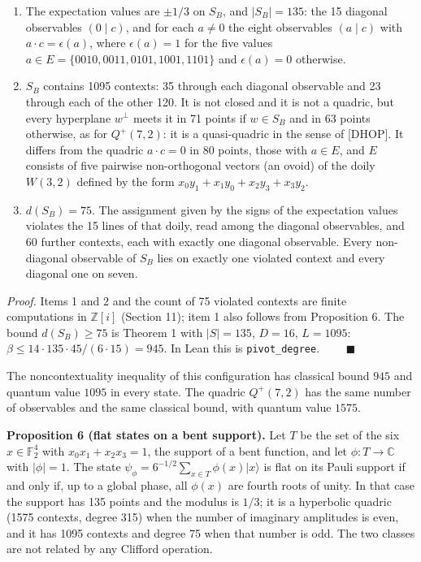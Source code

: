 \documentclass[11pt,a4paper]{article}
\providecommand{\tightlist}{\setlength{\itemsep}{0pt}\setlength{\parskip}{0pt}}
\begin{document}
\begin{enumerate}
\def\labelenumi{\arabic{enumi}.}
\tightlist
\item
  The expectation values are \(\pm 1/3\) on \(S_B\), and \(|S_B| = 135\): the 15 diagonal observables
  \((0 \mid c)\), and for each \(a \ne 0\) the eight observables \((a \mid c)\) with \(a \cdot c = \epsilon(a)\), where
  \(\epsilon(a) = 1\) for the five values \(a \in E = \{0010, 0011, 0101, 1001, 1101\}\) and \(\epsilon(a) = 0\)
  otherwise.
\item
  \(S_B\) contains 1095 contexts: 35 through each diagonal observable and 23 through each of the other
  120. It is not closed and it is not a quadric, but every hyperplane \(w^\perp\) meets it in 71 points if
  \(w \in S_B\) and in 63 points otherwise, as for \(Q^+(7,2)\): it is a quasi-quadric in the sense of
  {[}DHOP{]}. It differs from the quadric \(a \cdot c = 0\) in 80 points, those with \(a \in E\), and \(E\)
  consists of five pairwise non-orthogonal vectors (an ovoid) of the doily \(W(3,2)\) defined by the form
  \(x_0y_1 + x_1y_0 + x_2y_3 + x_3y_2\).
\item
  \(d(S_B) = 75\). The assignment given by the signs of the expectation values violates the 15 lines of
  that doily, read among the diagonal observables, and 60 further contexts, each with exactly one
  diagonal observable. Every non-diagonal observable of \(S_B\) lies on exactly one violated context and
  every diagonal one on seven.
\end{enumerate}

\emph{Proof.} Items 1 and 2 and the count of 75 violated contexts are finite computations in \(\mathbb{Z}[i]\)
(Section 11); item 1 also follows from Proposition 6. The bound \(d(S_B) \ge 75\) is Theorem 1 with
\(|S| = 135\), \(D = 16\), \(L = 1095\): \(\beta \le 14 \cdot 135 \cdot 45 / (6 \cdot 15) = 945\). In Lean this
is \texttt{pivot\_degree}. \(\qquad\blacksquare\)

The noncontextuality inequality of this configuration has classical bound \(945\) and quantum value
\(1095\) in every state. The quadric \(Q^+(7,2)\) has the same number of observables and the same classical
bound, with quantum value \(1575\).

\textbf{Proposition 6 (flat states on a bent support).} Let \(T\) be the set of the six \(x \in \mathbb{F}_2^4\) with
\(x_0x_1 + x_2x_3 = 1\), the support of a bent function, and let \(\phi : T \to \mathbb{C}\) with \(|\phi| = 1\).
The state \(\psi_\phi = 6^{-1/2}\sum_{x \in T}\phi(x)|x\rangle\) is flat on its Pauli support if and only if, up
to a global phase, all \(\phi(x)\) are fourth roots of unity. In that case the support has 135 points and the
modulus is \(1/3\); it is a hyperbolic quadric (1575 contexts, degree 315) when the number of imaginary
amplitudes is even, and it has 1095 contexts and degree 75 when that number is odd. The two classes are
not related by any Clifford operation.
\end{document}

